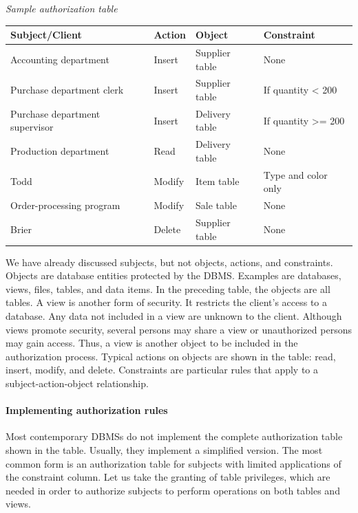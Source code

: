 \documentclass[
]{article}
\begin{document}
\emph{Sample authorization table}

\begin{longtable}[]{@{}llll@{}}
\toprule
Subject/Client & Action & Object & Constraint \\
\midrule
\endhead
Accounting department & Insert & Supplier table & None \\
Purchase department clerk & Insert & Supplier table & If quantity \textless{} 200 \\
Purchase department supervisor & Insert & Delivery table & If quantity \textgreater= 200 \\
Production department & Read & Delivery table & None \\
Todd & Modify & Item table & Type and color only \\
Order-processing program & Modify & Sale table & None \\
Brier & Delete & Supplier table & None \\
\bottomrule
\end{longtable}

We have already discussed subjects, but not objects, actions, and
constraints. Objects are database entities protected by the DBMS.
Examples are databases, views, files, tables, and data items. In the
preceding table, the objects are all tables. A view is another form of
security. It restricts the client's access to a database. Any data not
included in a view are unknown to the client. Although views promote
security, several persons may share a view or unauthorized persons may
gain access. Thus, a view is another object to be included in the
authorization process. Typical actions on objects are shown in the
table: read, insert, modify, and delete. Constraints are particular
rules that apply to a subject-action-object relationship.

\hypertarget{implementing-authorization-rules}{%
\paragraph*{Implementing authorization rules}\label{implementing-authorization-rules}}

Most contemporary DBMSs do not implement the complete authorization
table shown in the table. Usually, they implement a simplified version.
The most common form is an authorization table for subjects with limited
applications of the constraint column. Let us take the granting of table
privileges, which are needed in order to authorize subjects to perform
operations on both tables and views.
\end{document}
